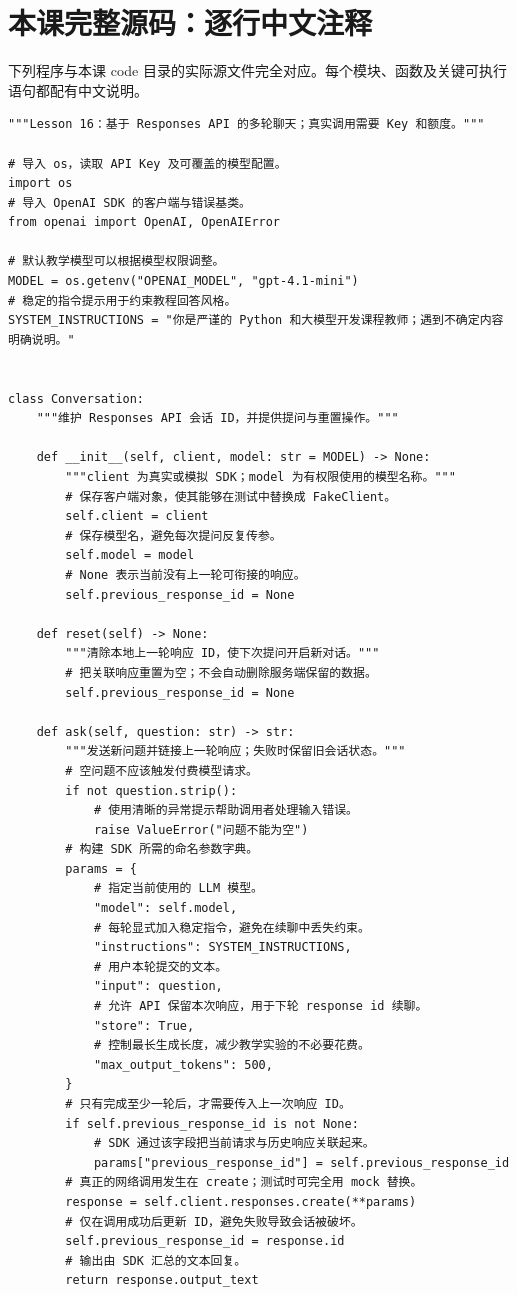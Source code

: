 \documentclass[UTF8,11pt,a4paper]{ctexart}
\begin{document}
\section{本课完整源码：逐行中文注释}
下列程序与本课 code 目录的实际源文件完全对应。每个模块、函数及关键可执行语句都配有中文说明。
\begin{Verbatim}[fontsize=\scriptsize,breaklines=true,breakanywhere=true]
"""Lesson 16：基于 Responses API 的多轮聊天；真实调用需要 Key 和额度。"""

# 导入 os，读取 API Key 及可覆盖的模型配置。
import os
# 导入 OpenAI SDK 的客户端与错误基类。
from openai import OpenAI, OpenAIError

# 默认教学模型可以根据模型权限调整。
MODEL = os.getenv("OPENAI_MODEL", "gpt-4.1-mini")
# 稳定的指令提示用于约束教程回答风格。
SYSTEM_INSTRUCTIONS = "你是严谨的 Python 和大模型开发课程教师；遇到不确定内容明确说明。"


class Conversation:
    """维护 Responses API 会话 ID，并提供提问与重置操作。"""

    def __init__(self, client, model: str = MODEL) -> None:
        """client 为真实或模拟 SDK；model 为有权限使用的模型名称。"""
        # 保存客户端对象，使其能够在测试中替换成 FakeClient。
        self.client = client
        # 保存模型名，避免每次提问反复传参。
        self.model = model
        # None 表示当前没有上一轮可衔接的响应。
        self.previous_response_id = None

    def reset(self) -> None:
        """清除本地上一轮响应 ID，使下次提问开启新对话。"""
        # 把关联响应重置为空；不会自动删除服务端保留的数据。
        self.previous_response_id = None

    def ask(self, question: str) -> str:
        """发送新问题并链接上一轮响应；失败时保留旧会话状态。"""
        # 空问题不应该触发付费模型请求。
        if not question.strip():
            # 使用清晰的异常提示帮助调用者处理输入错误。
            raise ValueError("问题不能为空")
        # 构建 SDK 所需的命名参数字典。
        params = {
            # 指定当前使用的 LLM 模型。
            "model": self.model,
            # 每轮显式加入稳定指令，避免在续聊中丢失约束。
            "instructions": SYSTEM_INSTRUCTIONS,
            # 用户本轮提交的文本。
            "input": question,
            # 允许 API 保留本次响应，用于下轮 response id 续聊。
            "store": True,
            # 控制最长生成长度，减少教学实验的不必要花费。
            "max_output_tokens": 500,
        }
        # 只有完成至少一轮后，才需要传入上一次响应 ID。
        if self.previous_response_id is not None:
            # SDK 通过该字段把当前请求与历史响应关联起来。
            params["previous_response_id"] = self.previous_response_id
        # 真正的网络调用发生在 create；测试时可完全用 mock 替换。
        response = self.client.responses.create(**params)
        # 仅在调用成功后更新 ID，避免失败导致会话被破坏。
        self.previous_response_id = response.id
        # 输出由 SDK 汇总的文本回复。
        return response.output_text



\end{Verbatim}
\end{document}
